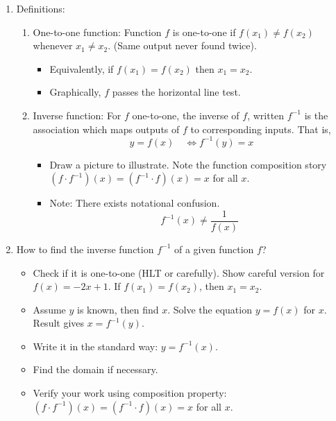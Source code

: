 \documentclass{article}
\begin{document}
\begin{enumerate}
\item Definitions: 
\begin{enumerate}
\item One-to-one function: Function $f$ is one-to-one if $f(x_1)\neq f(x_2)$ whenever $x_1\neq x_2$. (Same output never found twice).
\begin{itemize}
\item Equivalently, if $f(x_1)=f(x_2)$ then $x_1=x_2$. 
\item Graphically, $f$ passes the horizontal line test.
\end{itemize}
\item Inverse function: For $f$ one-to-one, the inverse of $f$, written $f^{-1}$ is the association which maps outputs of $f$ to corresponding inputs. That is,
\[
y=f(x) \quad \Longleftrightarrow f^{-1}(y)=x
\]
\begin{itemize}
\item Draw a picture to illustrate. Note the function composition story $(f\cdot f^{-1})(x) = (f^{-1} \cdot f)(x) = x$ for all $x$.
\item Note: There exists notational confusion.
$$
f^{-1} (x) \neq \frac{1}{f(x)}
$$
\end{itemize}
\end{enumerate}


\item How to find the inverse function $f^{-1}$ of a given function $f$?
\begin{itemize}
\item Check if it is one-to-one (HLT or carefully). Show careful version for $f(x) = -2x+1$. If $f(x_1)=f(x_2)$, then $x_1=x_2$.
\item Assume $y$ is known, then find $x$. Solve the equation $y=f(x)$ for $x$. Result gives $x=f^{-1}(y)$.
\item Write it in the standard way: $y=f^{-1}(x)$.
\item Find the domain if necessary.
\item Verify your work using composition property: $(f\cdot f^{-1})(x) = (f^{-1} \cdot f)(x) = x$ for all $x$.
\end{itemize}


\end{enumerate}
\end{document}
